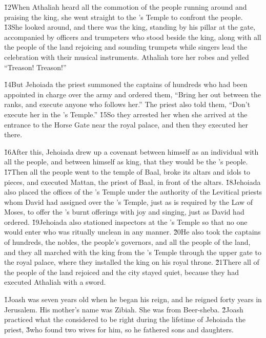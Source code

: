 \v{12}When Athaliah heard all the commotion of the people running around and praising the king, she went straight to the 's Temple to confront the people. \v{13}She looked around, and there was the king, standing by his pillar at the gate, accompanied by officers and trumpeters who stood beside the king, along with all the people of the land rejoicing and sounding trumpets while singers lead the celebration with their musical instruments. Athaliah tore her robes and yelled ``Treason! Treason!''

\v{14}But Jehoiada the priest summoned the captains of hundreds who had been appointed in charge over the army and ordered them, ``Bring her out between the ranks, and execute anyone who follows her.'' The priest also told them, ``Don't execute her in the 's Temple.'' \v{15}So they arrested her when she arrived at the entrance to the Horse Gate near the royal palace, and then they executed her there.

\v{16}After this, Jehoiada drew up a covenant between himself as an individual with all the people, and between himself as king, that they would be the 's people. \v{17}Then all the people went to the temple of Baal, broke its altars and idols to pieces, and executed Mattan, the priest of Baal, in front of the altars. \v{18}Jehoiada also placed the offices of the 's Temple under the authority of the Levitical priests whom David had assigned over the 's Temple, just as is required by the Law of Moses, to offer the 's burnt offerings with joy and singing, just as David had ordered. \v{19}Jehoiada also stationed inspectors at the 's Temple so that no one would enter who was ritually unclean in any manner. \v{20}He also took the captains of hundreds, the nobles, the people's governors, and all the people of the land, and they all marched with the king from the 's Temple through the upper gate to the royal palace, where they installed the king on his royal throne. \v{21}There all of the people of the land rejoiced and the city stayed quiet, because they had executed Athaliah with a sword.

\v{1}Joash was seven years old when he began his reign, and he reigned forty years in Jerusalem. His mother's name was Zibiah. She was from Beer-sheba. \v{2}Joash practiced what the  considered to be right during the lifetime of Jehoiada the priest, \v{3}who found two wives for him, so he fathered sons and daughters.

